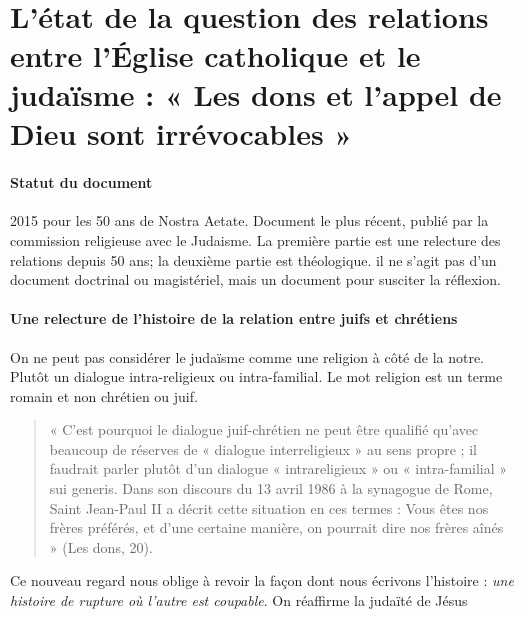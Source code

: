  ~
  \hypertarget{luxe9tat-de-la-question-des-relations-entre-luxe9glise-catholique-et-le-judauxefsme-les-dons-et-lappel-de-dieu-sont-irruxe9vocables}{%
  \section{L'état de la question des relations entre l'Église catholique
  et le judaïsme : « Les dons et l'appel de Dieu sont irrévocables
  »}\label{luxe9tat-de-la-question-des-relations-entre-luxe9glise-catholique-et-le-judauxefsme-les-dons-et-lappel-de-dieu-sont-irruxe9vocables}}

  
 
  
    
    \paragraph{Statut du document}
    2015 pour les 50 ans de Nostra Aetate.  Document le plus récent, publié par la commission religieuse avec le Judaisme.
    La première partie est une relecture des relations depuis 50 ans; la deuxième partie est théologique. il ne s'agit pas d'un document doctrinal ou magistériel, mais un document pour susciter la réflexion.
  
    
    \paragraph{Une relecture de l'histoire de la relation entre juifs et
    chrétiens}
    On ne peut pas considérer le judaïsme comme une religion à côté de la notre. Plutôt un dialogue intra-religieux ou intra-familial. Le mot religion est un terme romain et non chrétien ou juif. 
    \begin{quote}
    «  C’est  pourquoi  le  dialogue  juif-chrétien  ne  peut  être  qualifié  qu’avec  beaucoup  de  réserves de  «  dialogue  interreligieux  »  au  sens  propre  ;  il  faudrait  parler  plutôt  d’un  dialogue  «  intrareligieux  »  ou  «  intra-familial  »  sui  generis.  Dans  son  discours  du  13  avril  1986  à  la synagogue  de  Rome,  Saint  Jean-Paul  II  a  décrit  cette  situation  en  ces  termes  :  Vous  êtes  nos frères  préférés, et  d’une  certaine  manière, on pourrait  dire  nos  frères  aînés  »  (Les  dons, 20). 
\end{quote} 
    
    Ce nouveau regard nous oblige à revoir la façon dont nous écrivons l'histoire : \textit{une histoire de rupture où l'autre est coupable}. On réaffirme la judaïté de Jésus
 
